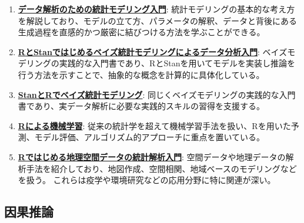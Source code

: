\documentclass[uplatex]{jsarticle} %
\begin{document}
\begin{enumerate}
\item \href{https://www.iwanami.co.jp/book/b257893.html}{\textbf{データ解析のための統計モデリング入門}}: 
統計モデリングの基本的な考え方を解説しており、モデルの立て方、パラメータの解釈、データと背後にある生成過程を直感的かつ厳密に結びつける方法を学ぶことができる。

\item \href{https://www.kspub.co.jp/book/detail/5165362.html}{\textbf{RとStanではじめるベイズ統計モデリングによるデータ分析入門}}:
ベイズモデリングの実践的な入門書であり、RとStanを用いてモデルを実装し推論を行う方法を示すことで、抽象的な概念を計算的に具体化している。

\item \href{https://www.kyoritsu-pub.co.jp/book/b10003786.html}{\textbf{StanとRでベイズ統計モデリング}}: 
同じくベイズモデリングの実践的な入門書であり、実データ解析に必要な実践的スキルの習得を支援する。

\item \href{https://www.shoeisha.co.jp/book/detail/9784798167343}{\textbf{Rによる機械学習}}:
従来の統計学を超えて機械学習手法を扱い、Rを用いた予測、モデル評価、アルゴリズム的アプローチに重点を置いている。

\item \href{https://www.kspub.co.jp/book/detail/5273036.html}{\textbf{Rではじめる地理空間データの統計解析入門}}:
空間データや地理データの解析手法を紹介しており、地図作成、空間相関、地域ベースのモデリングなどを扱う。
これらは疫学や環境研究などの応用分野に特に関連が深い。
\end{enumerate}


\subsection{因果推論}
\end{document}
